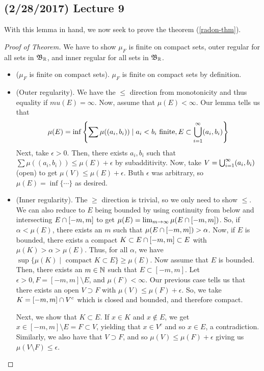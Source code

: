 \documentclass[11pt,leqno,oneside]{amsbook}
\numberwithin{thm}{section}
\begin{document}
  \subsection*{(2/28/2017) Lecture 9}
  With this lemma in hand, we now seek to prove the theorem (\ref{radon-thm}).
  \begin{proof}[Proof of Theorem]
    We have to show $\mu_F$ is finite on compact sets, outer
    regular for all sets in $\mathfrak{B}_{\mathbb R}$, and inner regular for all sets in
    $\mathfrak{B}_{\mathbb R}$.
    \begin{itemize}
    \item ($\mu_F$ is finite on compact sets).
      $\mu_F$ is finite on compact sets by definition.
    \item (Outer regularity). We have the $\leq$ direction from
      monotonicity and thus equality if $mu(E) = \infty$. Now, assume
      that $\mu(E) < \infty$. Our lemma tells us that \[
        \mu(E) = \inf \left\{ \sum \mu((a_i,b_i)) \mid a_i < b_i
          \text{ finite}, E \subset \bigcup_{i=1}^\infty (a_i,b_i) \right\}
      \]
      Next, take $\epsilon > 0$. Then, there exists $a_i,b_i$ such
      that $\sum \mu((a_i,b_i)) \leq \mu(E) +\epsilon$ by
      subadditivity. Now, take $V = \bigcup_{i=1}^\infty (a_i,b_i)$
      (open) to get $\mu(V) \leq \mu(E) + \epsilon$. Buth $\epsilon$
      was arbitrary, so $\mu(E) = \inf\{ \cdots \}$ as desired.
    \item (Inner regularity). The $\geq$ direction is trivial, so we
      only need to show $\leq$. We can also reduce to $E$ being
      bounded by using continuity from below and intersecting $E
      \cap [-m,m]$ to get $\mu(E) = \lim_{m \to \infty} \mu(E
      \cap [-m,m])$. So, if $\alpha < \mu(E)$, there exists an
      $m$ such that $\mu(E \cap [-m,m]) > \alpha$. Now, if $E$
      is bounded, there exists a
      compact $K \subset E \cap [-m,m] \subset E$ with $\mu(K) >
      \alpha > \mu(E)$. Thus, for all $\alpha$, we have $\sup \{\mu(K)
      \mid \text{ compact }K \subset E\} \geq \mu(E)$. Now assume that
      $E$ is bounded. Then, there exists an $m \in {\mathbb N}$ such that $E
      \subset [-m,m]$. Let $\epsilon > 0, F = [-m,m] \setminus E$, and
      $\mu(F) < \infty$. Our previous case tells us that there exists
      an open $V \supset F$  with $\mu(V) \leq \mu(F) + \epsilon$. So,
      we take $K = [-m,m] \cap V^c$ which is closed and bounded,
      and therefore compact.

      Next, we show that $K
      \subset E$. If $x \in K$ and $x \not \in E$, we get $x \in
      [-m,m] \setminus E = F \subset V$, yielding that $x \in V^c$ and
      so $x \in E$, a contradiction. Similarly, we also have that $V
      \supset F$, and so $\mu(V) \leq \mu(F) + \epsilon$ giving us
      $\mu(V \setminus F) \leq \epsilon$.


\end{itemize}
\end{proof}
\end{document}
